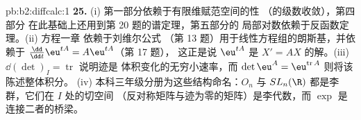 \begin{solution}{pb:b2:diffcalc:1}
\textbf{25.} (i) 第一部分依赖于有限维赋范空间的性
（的级数收敛），第四部分
在此基础上还用到第 20 题的谱定理，第五部分的
局部对数依赖于反函数定理。(ii) 方程一章
依赖于刘维尔公式
（第 13 题）用于线性方程组的朗斯基，并依赖于
$\frac{\dd}{\dd t}\eu^{tA} = A\eu^{tA}$（第 17 题），
这正是说 $\eu^{tA}$ 是 $X' = AX$ 的解。(iii)
$\dd(\det)_I = \operatorname{tr}$ 说明迹是
体积变化的无穷小速率，而 $\det\eu^A =
\eu^{\operatorname{tr}A}$ 则将该陈述整体积分。
(iv) 本科三年级分册为这些结构命名：$O_n$ 与
$SL_n(\R)$ 都是李群，它们在 $I$ 处的切空间
（反对称矩阵与迹为零的矩阵）是李代数，而
$\exp$ 是连接二者的桥梁。
\end{solution}
